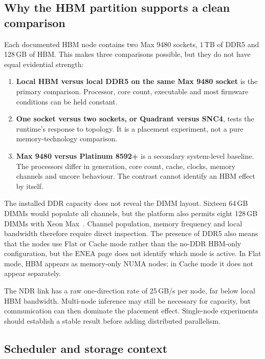 \FloatBarrier

\subsection{Why the HBM partition supports a clean comparison}

Each documented HBM node contains two Max 9480 sockets, 1\,TB of DDR5
and 128\,GB of HBM.  This makes three comparisons possible, but they do
not have equal evidential strength:

\begin{enumerate}
  \item \textbf{Local HBM versus local DDR5 on the same Max 9480
        socket} is the primary comparison.  Processor, core count,
        executable and most firmware conditions can be held constant.

  \item \textbf{One socket versus two sockets, or Quadrant versus SNC4},
        tests the runtime's response to topology.  It is a placement
        experiment, not a pure memory-technology comparison.

  \item \textbf{Max 9480 versus Platinum 8592+} is a secondary
        system-level baseline.  The processors differ in generation,
        core count, cache, clocks, memory channels and uncore behaviour.
        The contrast cannot identify an HBM effect by itself.
\end{enumerate}

The installed DDR capacity does not reveal the DIMM layout.  Sixteen
64\,GB DIMMs would populate all channels, but the platform also permits
eight 128\,GB DIMMs with Xeon Max~\cite{lp1603}.  Channel population,
memory frequency and local bandwidth therefore require direct
inspection.  The presence of DDR5 also means that the nodes use Flat or
Cache mode rather than the no-DDR HBM-only configuration, but the ENEA
page does not identify which mode is active.  In Flat mode, HBM appears
as memory-only NUMA nodes; in Cache mode it does not appear separately.

The NDR link has a raw one-direction rate of 25\,GB/s per node, far
below local HBM bandwidth.  Multi-node inference may still be necessary
for capacity, but communication can then dominate the placement effect.
Single-node experiments should establish a stable result before adding
distributed parallelism.

\subsection{Scheduler and storage context}

